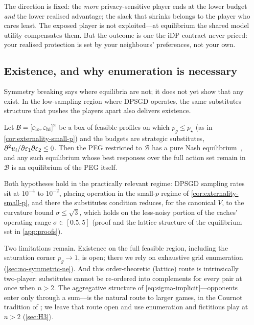 The direction is fixed: the \emph{more} privacy-sensitive player
ends at the lower budget \emph{and} the lower realised advantage;
the slack that shrinks belongs to the player who cares least. The
exposed player is not exploited---at equilibrium the shared model
utility compensates them. But the outcome is one the \ac{iDP}
contract never priced: your realised protection is set by your
neighbours' preferences, not your own.

\subsection{Existence, and why enumeration is necessary}
\label{sec:existence}

Symmetry breaking says where equilibria are not; it does not yet
show that any exist. In the low-sampling region where \ac{DPSGD}
operates, the same substitutes structure that pushes the players
apart also delivers existence.

\begin{theorem}[Pure \ac{NE} existence on a substitutes box, $n = 2$]
\label{thm:continuous-ne-smallp}
Let $\mathcal{B} = [\varepsilon_{\mathrm{lo}}, \varepsilon_{\mathrm{hi}}]^2$ be a box of
feasible profiles on which $p_g \leq p_\star$ (as in
\cref{cor:externality-small-p}) and the budgets are strategic
substitutes, $\partial^2 u_i / \partial \varepsilon_1 \partial \varepsilon_2 \leq
0$. Then the \ac{PEG} restricted to $\mathcal{B}$ has a pure Nash
equilibrium~\cite{topkis1979equilibrium,
milgrom1990rationalizability}, and any such equilibrium whose best
responses over the full action set remain in $\mathcal{B}$ is an
equilibrium of the \ac{PEG} itself.
\end{theorem}

Both hypotheses hold in the practically relevant regime:
\ac{DPSGD} sampling rates sit at $10^{-4}$ to $10^{-2}$, placing
operation in the small-$p$ regime of
\cref{cor:externality-small-p}, and there the substitutes condition
reduces, for the canonical $V$, to the curvature bound $\sigma \leq
\sqrt 3$, which holds on the less-noisy portion of the caches'
operating range $\sigma \in [0.5, 5]$ (proof and the lattice
structure of the equilibrium set in \cref{app:proofs}).

Two limitations remain. Existence on the full feasible region,
including the saturation corner $p_g \to 1$, is open; there we rely
on exhaustive grid enumeration (\cref{sec:no-symmetric-ne}). And this
order-theoretic (lattice) route is intrinsically two-player:
substitutes cannot be
re-ordered into complements for every pair at once when $n > 2$. The
aggregative structure of \eqref{eq:sigma-implicit}---opponents enter
only through a sum---is the natural route to larger games, in the
Cournot tradition of \citet{novshek1985cournot}; we leave that
route open and use enumeration and fictitious play at $n > 2$
(\cref{sec:H3}).

